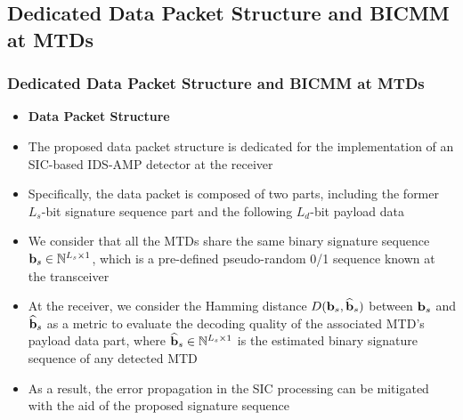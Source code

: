 \documentclass[9pt]{beamer}
\begin{document}
\subsection{Dedicated Data Packet Structure and BICMM at MTDs}
\begin{frame}
\frametitle{Dedicated Data Packet Structure and BICMM at MTDs}
\begin{itemize}
\item
{\bf Data Packet Structure}
\item
The proposed data packet structure is dedicated for the implementation of an SIC-based IDS-AMP detector at the receiver
\item
Specifically, the data packet is composed of two parts, including the former $L_s$-bit signature sequence part and the following $L_d$-bit payload data
\item
We consider that all the MTDs share the same binary signature sequence ${\bf b}_s\in \mathbb{N}^{L_s\times 1}$, which is a pre-defined pseudo-random 0/1 sequence known at the transceiver
\item
At the receiver, we consider the Hamming distance $D({\bf b}_s,\widehat{\bf b}_s)$ between ${\bf b}_s$ and $\widehat{\bf b}_s$ as a metric to evaluate the decoding quality of the associated MTD's payload data part, where $\widehat{\bf b}_s\in \mathbb{N}^{L_s\times 1}$ is the estimated binary signature sequence of any detected MTD
\item
As a result, the error propagation in the SIC processing can be mitigated with the aid of the proposed signature sequence
\end{itemize}
\end{frame}
\end{document}
